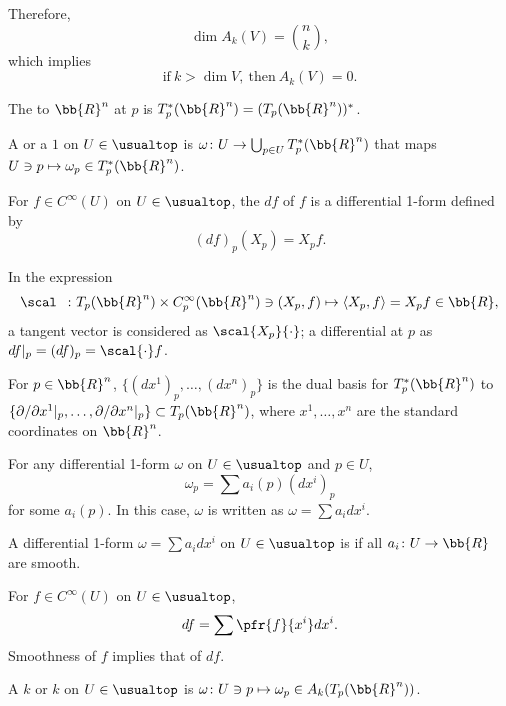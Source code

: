 Therefore,
\[
\dim A_k(V) = \binom{n}{k},
\]
which implies
\[
\text{if}\ k > \dim V,\ \text{then}\ A_k(V) = 0.
\]

The  to $\bb{R}^n$ at $p$ is $T^*_p (\bb{R}^n) = (T_p(\bb{R}^n))^*$.

A  or a  $1$ on $U \in \usualtop$ is $\omega \colon U \to \bigcup_{p \in U} T^*_p (\bb{R}^n)$ that maps $U \ni p \mapsto \omega_p \in T^*_p (\bb{R}^n)$.

For $f \in C^\infty (U)$ on $U \in \usualtop$, the  $df$ of $f$ is a differential 1-form defined by
\[
(df)_p (X_p) = X_p f.
\]


In the expression
\[
\scal\ \  \colon T_p(\bb{R}^n) \times C^\infty_p (\bb{R}^n) \ni (X_p, f) \mapsto \langle X_p, f \rangle = X_p f \in \bb{R},
\]
a tangent vector is considered as $\scal{X_p}{\cdot}$; a differential at $p$ as $df|_p = (df)_p = \scal{\cdot}f$.


For $p \in \bb{R}^n$, $\{ (dx^1)_p, \dotsc, (dx^n)_p \} $ is the dual basis for $T_p^* (\bb{R}^n)$ to $\{ \partial / \partial x^1|_p, \dotsc, \partial/\partial x^n|_p \} \subset T_p (\bb{R}^n)$, where $x^1, \dotsc, x^n$ are the standard coordinates on $\bb{R}^n$.

For any differential 1-form $\omega$ on $U \in \usualtop$ and $p \in U$,
\[
\omega_p = \sum a_i(p) (dx^i)_p
\]
for some $a_i (p)$. In this case, $\omega$ is written as $\omega = \sum a_i dx^i$.

A differential 1-form $\omega = \sum a_i dx^i$ on $U \in \usualtop$ is  if all $a_i \colon U \to \bb{R}$ are smooth.

For $f \in C^\infty(U)$ on $U \in \usualtop$,
\[
df = \sum \pfr{f}{x^i} dx^i.
\]
Smoothness of $f$ implies that of $df$.

A  $k$ or  $k$ on $U \in \usualtop$ is $\omega \colon U \ni p \mapsto \omega_p \in A_k (T_p(\bb{R}^n))$.

